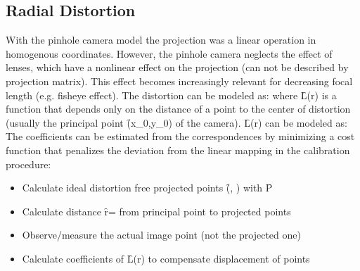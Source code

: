 \subsection{Radial Distortion}
With the pinhole camera model the projection was a linear operation in homogenous coordinates. However, the pinhole camera neglects the effect of lenses, which have a nonlinear effect on the projection (can not be described by projection matrix). This effect becomes increasingly relevant for decreasing focal length (e.g. fisheye effect). The distortion can be modeled as:
where \f{L(r)} is a function that depends only on the distance of a point to the center of distortion (usually the principal point \f{(x_0,y_0)} of the camera). \f{L(r)} can be modeled as:
The coefficients can be estimated from the correspondences by minimizing a cost function that penalizes the deviation from the linear mapping in the calibration procedure:
\begin{itemize}
    \item Calculate ideal distortion free projected points \f{(, )} with \f{P}
    \item Calculate distance \f{r=} from principal point to projected points
    \item Observe/measure the actual image point (not the projected one)
    \item Calculate coefficients of \f{L(r)} to compensate displacement of points
\end{itemize}

\newpage